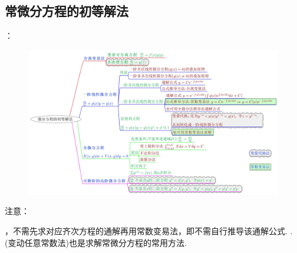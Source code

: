 \documentclass[12pt,UTF8,fleqn]{ctexart}
\begin{document}
\subsection{常微分方程的初等解法}
\begin{enumerate}
：
\begin{figure}[H]
\begin{center}
\includegraphics[height=0.45\textheight]{structures.jpg}
\end{center}
\end{figure}

注意：
\begin{enumerate}
，不需先求对应齐次方程的通解再用常数变易法，即不需自行推导该通解公式.
.
(变动任意常数法)也是求解常微分方程的常用方法.
\end{enumerate}
\end{enumerate}
\end{document}
